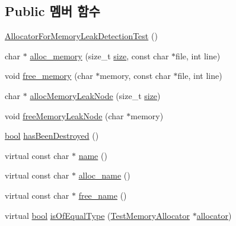 \subsection*{Public 멤버 함수}
\begin{DoxyCompactItemize}
\item 
\hyperlink{class_allocator_for_memory_leak_detection_test_a16feb3ff47611a2e3548bfc5f75ec165}{Allocator\+For\+Memory\+Leak\+Detection\+Test} ()
\item 
char $\ast$ \hyperlink{class_allocator_for_memory_leak_detection_test_a96f1e3fb5f11e9df843ddfc1cf50bf98}{alloc\+\_\+memory} (size\+\_\+t \hyperlink{gst__avb__playbin_8c_a439227feff9d7f55384e8780cfc2eb82}{size}, const char $\ast$file, int line)
\item 
void \hyperlink{class_allocator_for_memory_leak_detection_test_a529ac9813d3b0836ce0b964449942534}{free\+\_\+memory} (char $\ast$memory, const char $\ast$file, int line)
\item 
char $\ast$ \hyperlink{class_allocator_for_memory_leak_detection_test_aac775b3e19729b16bad56a45ddfcf01c}{alloc\+Memory\+Leak\+Node} (size\+\_\+t \hyperlink{gst__avb__playbin_8c_a439227feff9d7f55384e8780cfc2eb82}{size})
\item 
void \hyperlink{class_allocator_for_memory_leak_detection_test_a10f2958f3b7378256e933896ccc93df0}{free\+Memory\+Leak\+Node} (char $\ast$memory)
\item 
\hyperlink{avb__gptp_8h_af6a258d8f3ee5206d682d799316314b1}{bool} \hyperlink{class_test_memory_allocator_ae26c82159ce24eb59770352585b402fd}{has\+Been\+Destroyed} ()
\item 
virtual const char $\ast$ \hyperlink{class_test_memory_allocator_a6a96605bec5749750a0b4be6e2d6e721}{name} ()
\item 
virtual const char $\ast$ \hyperlink{class_test_memory_allocator_afab6c44b5468c71a699c1efbd787e6e7}{alloc\+\_\+name} ()
\item 
virtual const char $\ast$ \hyperlink{class_test_memory_allocator_aac134aac79b30bc5903d0b2b7cc55b74}{free\+\_\+name} ()
\item 
virtual \hyperlink{avb__gptp_8h_af6a258d8f3ee5206d682d799316314b1}{bool} \hyperlink{class_test_memory_allocator_a3d6a5cc2f6b7a38b3f1d3e0567bf4f93}{is\+Of\+Equal\+Type} (\hyperlink{class_test_memory_allocator}{Test\+Memory\+Allocator} $\ast$\hyperlink{_memory_leak_warning_test_8cpp_a83fc2e9b9142613f7df2bcc3ff8292bc}{allocator})
\end{DoxyCompactItemize}
